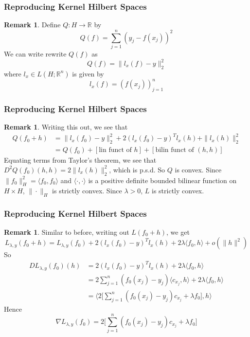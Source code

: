 \documentclass[notheorems]{beamer}
\theoremstyle{definition}
\newtheorem{rem}[definition]{Remark}
\newcommand{\lam}{\lambda}
\newcommand{\R}{\mathbb{R}}
\renewcommand{\r}{\rangle}
\renewcommand{\l}{\langle}
\begin{document}
\begin{frame}
\frametitle{Reproducing Kernel Hilbert Spaces}
\begin{rem}
Define $Q: H \rightarrow \R$ by $$Q(f) = \sum_{j=1}^n (y_j - f(x_j) )^2$$ 
\pause
We can write rewrite $Q(f)$ as  $$Q(f) = \|l_x(f) - y\|_2^2$$ where $l_x \in L(H; \R^n)$ is given by $$l_x(f) = (f(x_j))_{j=1}^n$$ 
\end{rem}
\end{frame}












\begin{frame}
\frametitle{Reproducing Kernel Hilbert Spaces}
\begin{rem}
Writing this out, we see that 
\begin{align*}
Q(f_0 + h) 
&= \|l_x(f_0) - y\|_2^2  + 2(l_x(f_0) - y)^T l_x(h) + \|l_x(h)\|_2^2 \\
&= Q(f_0) + [\text{lin funct of $h$}] +  [\text{bilin funct of $(h,h)$}]
\end{align*}
\pause
Equating terms from Taylor's theorem, we see that $D^2Q(f_0)(h,h) = 2\|l_x(h)\|_2^2$, which is p.s.d. So $Q$ is convex. Since $\|f_0\|^2_H = \l f_0, f_0\r$ and $\l \cdot, \cdot \r$ is a positive definite bounded bilinear function on $H \times H$, $\|\cdot\|_H$ is strictly convex. Since $\lam > 0$, $L$ is strictly convex. 
\end{rem}
\end{frame}














\begin{frame}
\frametitle{Reproducing Kernel Hilbert Spaces}
\begin{rem}
Similar to before, writing out $L(f_0 + h)$, we get
$$L_{\lam, y}(f_0 + h) = L_{\lam, y}(f_0) + 2(l_x(f_0) - y)^T l_x(h) + 2 \lam \l f_0 , h\r + o(\|h\|^2) $$
\pause
So 
\begin{align*}
DL_{\lam, y}(f_0)(h) 
&= 2(l_x(f_0) - y)^T l_x(h) + 2 \lam \l f_0 , h\r \\
&= 2\sum_{j=1}^n (f_0(x_j)- y_j) \l c_{x_j}, h\r +  2 \lam \l f_0 , h\r \\
&= \bigg \l  2\bigg [ \sum_{j=1}^n (f_0(x_j)- y_j) c_{x_j} + \lam f_0\bigg ] , h \bigg \r 
\end{align*}
\pause
Hence $$\nabla L_{\lam, y}(f_0) = 2\bigg [ \sum_{j=1}^n (f_0(x_j)- y_j) c_{x_j} + \lam f_0\bigg ]$$
\end{rem}
\end{frame}
\end{document}
